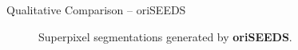 \documentclass[handout]{beamer}
\begin{document}
	\begin{frame}{Qualitative Comparison -- oriSEEDS}
		\begin{figure}
   			\centering
   			\caption{Superpixel segmentations generated by \textbf{oriSEEDS}.}
   		\end{figure}
	\end{frame}
	
\end{document}
